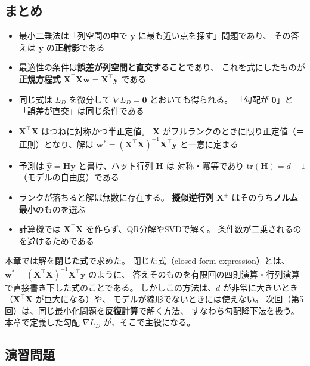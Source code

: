 \subsection{まとめ}

\begin{itemize}
  \item 最小二乗法は「列空間の中で $\bm{y}$ に最も近い点を探す」問題であり、
    その答えは $\bm{y}$ の\textbf{正射影}である
  \item 最適性の条件は\textbf{誤差が列空間と直交すること}であり、
    これを式にしたものが\textbf{正規方程式} $\bm{X}^\top\bm{X}\bm{w} = \bm{X}^\top\bm{y}$ である
  \item 同じ式は $L_D$ を微分して $\nabla L_D = \bm{0}$ とおいても得られる。
    「勾配が $\bm{0}$」と「誤差が直交」は同じ条件である
  \item $\bm{X}^\top\bm{X}$ はつねに対称かつ半正定値。
    $\bm{X}$ がフルランクのときに限り正定値（＝正則）となり、解は
    $\bm{w}^* = (\bm{X}^\top\bm{X})^{-1}\bm{X}^\top\bm{y}$ と一意に定まる
  \item 予測は $\hat{\bm{y}} = \bm{H}\bm{y}$ と書け、ハット行列 $\bm{H}$ は
    対称・冪等であり $\mathrm{tr}(\bm{H}) = d+1$（モデルの自由度）である
  \item ランクが落ちると解は無数に存在する。
    \textbf{擬似逆行列} $\bm{X}^{+}$ はそのうち\textbf{ノルム最小}のものを選ぶ
  \item 計算機では $\bm{X}^\top\bm{X}$ を作らず、QR分解やSVDで解く。
    条件数が二乗されるのを避けるためである
\end{itemize}

本章では解を\textbf{閉じた式}で求めた。
閉じた式（closed-form expression）とは、$\bm{w}^* = (\bm{X}^\top\bm{X})^{-1}\bm{X}^\top\bm{y}$ のように、
答えそのものを有限回の四則演算・行列演算で直接書き下した式のことである。
しかしこの方法は、$d$ が非常に大きいとき（$\bm{X}^\top\bm{X}$ が巨大になる）や、
モデルが線形でないときには使えない。
次回（第5回）は、同じ最小化問題を\textbf{反復計算}で解く方法、
すなわち勾配降下法を扱う。
本章で定義した勾配 $\nabla L_D$ が、そこで主役になる。


\subsection{演習問題}

